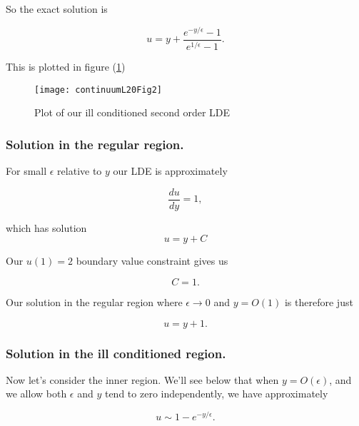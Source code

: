 So the exact solution is

\begin{equation}\label{eqn:continuumL20:310}
u = y + \frac{e^{-y/\epsilon} - 1}{e^{1/\epsilon} - 1}.
\end{equation}

This is plotted in figure (\ref{fig:continuumL20:continuumL20Fig2})
\begin{figure}[htp]
   \centering
   \texttt{[image: continuumL20Fig2]}
   \caption{Plot of our ill conditioned second order LDE}\label{fig:continuumL20:continuumL20Fig2}
\end{figure}

\subsubsection{Solution in the regular region.}

For small $\epsilon$ relative to $y$ our LDE is approximately

\begin{equation}\label{eqn:continuumL20:630}
\frac{du}{dy} = 1,
\end{equation}

which has solution
\begin{equation}\label{eqn:continuumL20:650}
u = y + C
\end{equation}

Our $u(1) = 2$ boundary value constraint gives us

\begin{equation}\label{eqn:continuumL20:670}
C = 1.
\end{equation}

Our solution in the regular region where $\epsilon \rightarrow 0$ and $y = O(1)$ is therefore just

\begin{equation}\label{eqn:continuumL20:690}
u = y + 1.
\end{equation}

\subsubsection{Solution in the ill conditioned region.}

Now let's consider the inner region.  We'll see below that when $y = O(\epsilon)$, and we allow both $\epsilon$ and $y$ tend to zero independently, we have approximately

\begin{equation}\label{eqn:continuumL20:350}
u \sim 1 - e^{-y/\epsilon}.
\end{equation}

